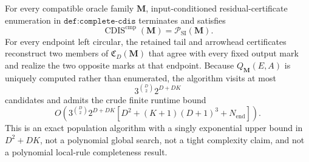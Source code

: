 For every compatible oracle family \(\mathbf M\), input-conditioned residual-certificate enumeration in \(\texttt{def:complete-cdis}\) terminates and satisfies
\[
\operatorname{CDIS}^{\mathrm{cmp}}(\mathbf M)=\mathcal P_{\mathrm{SI}}(\mathbf M).
\]
For every endpoint left circular, the retained tail and arrowhead certificates reconstruct two members of \(\mathfrak C_D(\mathbf M)\) that agree with every fixed output mark and realize the two opposite marks at that endpoint.  Because \(Q_{\mathbf M}(E,A)\) is uniquely computed rather than enumerated, the algorithm visits at most
\[
3^{\binom D2}2^{D+DK}
\]
candidates and admits the crude finite runtime bound
\[
O\!\left(3^{\binom D2}2^{D+DK}
\left[D^2+(K+1)(D+1)^3+N_{\mathrm{end}}\right]\right).
\]
This is an exact population algorithm with a singly exponential upper bound in \(D^2+DK\), not a polynomial global search, not a tight complexity claim, and not a polynomial local-rule completeness result.